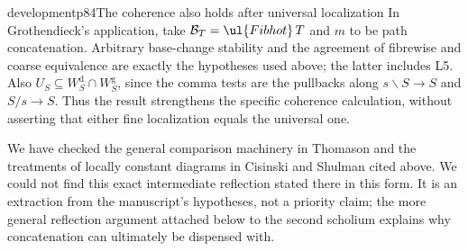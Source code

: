 \begin{dcomment}{development}{p84}{The coherence also holds after universal localization}
In Grothendieck's application, take $\mathcal B_T=\ul{Fibhot}\,T$ and $m$ to be path concatenation. Arbitrary base-change stability and the agreement of fibrewise and coarse equivalence are exactly the hypotheses used above; the latter includes L5. Also $U_S\subseteq W_S^{\mathrm d}\cap W_S^{\mathrm g}$, since the comma tests are the pullbacks along $s\backslash S\to S$ and $S/s\to S$. Thus the result strengthens the specific coherence calculation, without asserting that either fine localization equals the universal one.

We have checked the general comparison machinery in Thomason and the treatments of locally constant diagrams in Cisinski and Shulman cited above. We could not find this exact intermediate reflection stated there in this form. It is an extraction from the manuscript's hypotheses, not a priority claim; the more general reflection argument attached below to the second scholium explains why concatenation can ultimately be dispensed with.
\end{dcomment}

